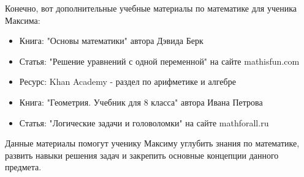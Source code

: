 \documentclass{article}
\begin{document}
Конечно, вот дополнительные учебные материалы по математике для ученика Максима:

\begin{itemize}
    \item Книга: "Основы математики" автора Дэвида Берк
    \item Статья: "Решение уравнений с одной переменной" на сайте mathisfun.com
    \item Ресурс: Khan Academy - раздел по арифметике и алгебре
    \item Книга: "Геометрия. Учебник для 8 класса" автора Ивана Петрова
    \item Статья: "Логические задачи и головоломки" на сайте mathforall.ru
\end{itemize}

Данные материалы помогут ученику Максиму углубить знания по математике, развить навыки решения задач и закрепить основные концепции данного предмета.
\end{document}
